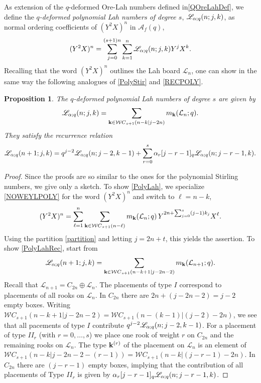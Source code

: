 \documentclass[10pt]{amsart}
\newtheorem{proposition}[theorem]{Proposition}%
\begin{document}
As extension of the $q$-deformed Ore-Lah numbers defined in\eqref{QOreLahDef}, we define the {\em $q$-deformed polynomial Lah numbers of degree $s$}, ${\mathscr L}_{{\bf \alpha};q}(n;j,k)$, as normal ordering coefficients of $(Y^2X)^n$ in ${\mathcal A}_f(q)$,
$$
(Y^2X)^n=\sum_{j=0}^{(s+1)n}\sum_{k=1}^{n} {\mathscr L}_{{\bf \alpha};q}(n;j,k )Y^j X^{k}. 
$$
Recalling that the word $(Y^2X)^n$ outlines the Lah board ${\mathcal L}_n$, one can show in the same way the following analogues of \eqref{PolyStir} and \eqref{RECPOLY}.
\begin{proposition} The $q$-deformed polynomial Lah numbers of degree $s$ are given by 
\begin{equation}\label{PolyLah}
{\mathscr L}_{{\bf \alpha};q}(n;j,k)=\sum_{{\bf k} \in {\mathcal WC}_{s+1}(n-k|j-2n)} m_{{\bf k}}({\mathcal L}_n;q).
\end{equation}
They satisfy the recurrence relation
\begin{equation}\label{PolyLahRec}
{\mathscr L}_{{\bf \alpha};q}(n+1;j,k)=q^{j-2}{\mathscr L}_{{\bf \alpha};q}(n;j-2,k-1)+\sum_{r=0}^s \alpha_r [j-r-1]_q {\mathscr L}_{{\bf \alpha};q}(n;j-r-1,k).
\end{equation}
\end{proposition}
\begin{proof}
Since the proofs are so similar to the ones for the polynomial Stirling numbers, we give only a sketch. To show \eqref{PolyLah}, we specialize \eqref{NOWEYLPOLY} for the word $(Y^2X)^n$ and switch to $\ell=n-k$, 
$$
(Y^2X)^n=\sum_{\ell=1}^{n} \sum_{{\bf k} \in {\mathcal WC}_{s+1}(n-\ell)} m_{{\bf k}}({\mathcal L}_n;q) \, Y^{2n+\sum_{j=0}^s (j-1)k_j} X^{\ell}.
$$
Using the partition \eqref{partition} and letting $j=2n+t$, this yields the assertion. To show \eqref{PolyLahRec}, start from
$$
{\mathscr L}_{{\bf \alpha};q}(n+1;j,k)=\sum_{{\bf k} \in {\mathcal WC}_{s+1}(n-k+1|j-2n-2)} m_{{\bf k}}({\mathcal L}_{n+1};q).
$$
Recall that ${\mathcal L}_{n+1}=C_{2n}\oplus {\mathcal L}_n$. The placements of type $I$ correspond to placements of all rooks on ${\mathcal L}_n$. In $C_{2n}$ there are $2n+(j-2n-2)=j-2$ empty boxes. Writing ${\mathcal WC}_{s+1}(n-k+1|j-2n-2)={\mathcal WC}_{s+1}(n-(k-1)|(j-2)-2n)$, we see that all pacements of type $I$ contribute $q^{j-2}{\mathscr L}_{{\bf \alpha};q}(n;j-2,k-1)$. For a placement of type $II_r$ (with $r=0,\ldots,s$) we place one rook of weight $r$ on $C_{2n}$ and the remaining rooks on ${\mathcal L}_n$. The type ${\bf k}^{(r)}$ of the placement on ${\mathcal L}_n$ is an element of ${\mathcal WC}_{s+1}(n-k|j-2n-2-(r-1))={\mathcal WC}_{s+1}(n-k|(j-r-1)-2n)$. In $C_{2n}$ there are $(j-r-1)$ empty boxes, implying that the contribution of all placements of Type $II_r$ is given by $\alpha_r [j-r-1]_q {\mathscr L}_{{\bf \alpha};q}(n;j-r-1,k)$. 
\end{proof}
\end{document}
